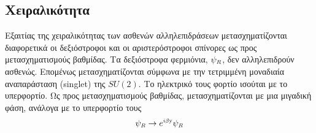 \subsection{Χειραλικότητα}
Εξαιτίας της χειραλικότητας των ασθενών αλληλεπιδράσεων 
μετασχηματίζονται διαφορετικά οι δεξιόστροφοι και οι αριστερόστροφοι σπίνορες ως προς μετασχηματισμούς βαθμίδας. %
Τα δεξιόστροφα φερμιόνια, $\psi\subscr{R}$, δεν αλληλεπιδρούν ασθενώς. Επομένως μετασχηματίζονται σύμφωνα με την τετριμμένη μοναδιαία αναπαράσταση (singlet) της $SU(2)$. Το ηλεκτρικό τους φορτίο ισούται με το υπερφορτίο. Ως προς μετασχηματισμούς 
βαθμίδας, μετασχηματίζονται με μια μιγαδική φάση, ανάλογα με το υπερφορτίο τους 
\begin{equation}
    \psi\subscr{R}\rightarrow e\superscr{i\beta\y}\psi\subscr{R}
\end{equation}
\\

